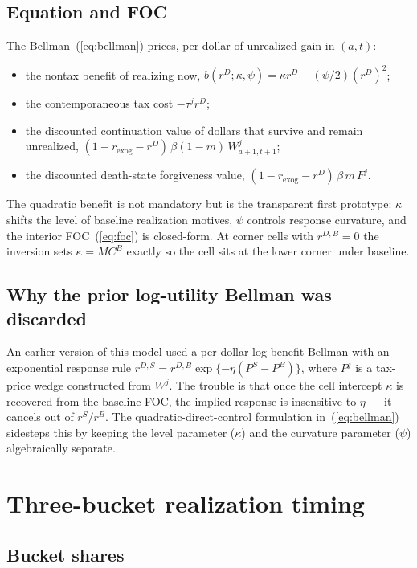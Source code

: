 \documentclass[11pt]{article}
\begin{document}
\subsection{Equation and FOC}

The Bellman~(\ref{eq:bellman}) prices, per dollar of unrealized gain in
$(a,t)$:
\begin{itemize}
  \item the nontax benefit of realizing now,
        $b(r^D; \kappa, \psi) = \kappa r^D - (\psi/2)(r^D)^2$;
  \item the contemporaneous tax cost $-\tau^j r^D$;
  \item the discounted continuation value of dollars that survive and remain
        unrealized,
        $(1 - r_{\text{exog}} - r^D)\,\beta(1-m)\,W^j_{a+1,t+1}$;
  \item the discounted death-state forgiveness value,
        $(1 - r_{\text{exog}} - r^D)\,\beta\,m\,F^j$.
\end{itemize}
The quadratic benefit is not mandatory but is the transparent first
prototype: $\kappa$ shifts the level of baseline realization motives,
$\psi$ controls response curvature, and the interior FOC~(\ref{eq:foc}) is
closed-form. At corner cells with $r^{D,B} = 0$ the inversion sets
$\kappa = MC^B$ exactly so the cell sits at the lower corner under
baseline.

\subsection{Why the prior log-utility Bellman was discarded}

An earlier version of this model used a per-dollar log-benefit Bellman
with an exponential response rule
$r^{D,S} = r^{D,B}\exp\{-\eta(P^S - P^B)\}$, where $P^j$ is a tax-price
wedge constructed from $W^j$. The trouble is that once the cell intercept
$\kappa$ is recovered from the baseline FOC, the implied response is
insensitive to $\eta$ --- it cancels out of $r^S/r^B$. The
quadratic-direct-control formulation in~(\ref{eq:bellman}) sidesteps this
by keeping the level parameter ($\kappa$) and the curvature parameter
($\psi$) algebraically separate.

\section{Three-bucket realization timing}
\label{app:buckets}

\subsection{Bucket shares}
\end{document}
